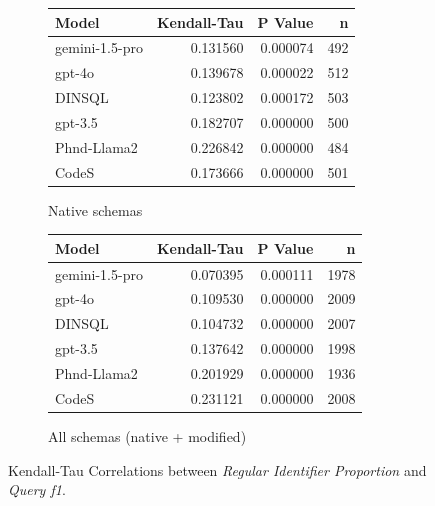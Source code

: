 \begin{figure}
  \centering
  \begin{subfigure}{.5\linewidth}
      \centering
      \begin{tabular}{lrrr}
\toprule
Model & Kendall-Tau & P Value & n \\
\midrule
gemini-1.5-pro & 0.131560 & 0.000074 & 492 \\
gpt-4o & 0.139678 & 0.000022 & 512 \\
DINSQL & 0.123802 & 0.000172 & 503 \\
gpt-3.5 & 0.182707 & 0.000000 & 500 \\
Phnd-Llama2 & 0.226842 & 0.000000 & 484 \\
CodeS & 0.173666 & 0.000000 & 501 \\
\bottomrule
\end{tabular}

      \caption{Native schemas}
      \label{table:nathigh-f1-ktau-native}
  \end{subfigure}%
  \begin{subfigure}{.5\linewidth}
      \centering
      \begin{tabular}{lrrr}
\toprule
Model & Kendall-Tau & P Value & n \\
\midrule
gemini-1.5-pro & 0.070395 & 0.000111 & 1978 \\
gpt-4o & 0.109530 & 0.000000 & 2009 \\
DINSQL & 0.104732 & 0.000000 & 2007 \\
gpt-3.5 & 0.137642 & 0.000000 & 1998 \\
Phnd-Llama2 & 0.201929 & 0.000000 & 1936 \\
CodeS & 0.231121 & 0.000000 & 2008 \\
\bottomrule
\end{tabular}

      \caption{All schemas (native + modified)}
      \label{table:nathigh-f1-ktau-all}
  \end{subfigure}
  \caption{Kendall-Tau Correlations between \emph{Regular Identifier Proportion} and \emph{Query f1}.}
\end{figure}

